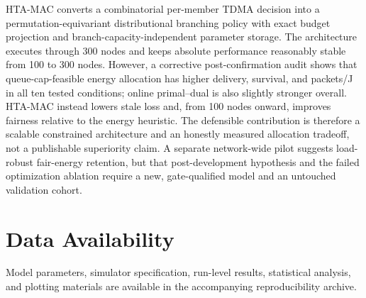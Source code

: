 \documentclass[journal]{IEEEtran}
\newcommand{\method}{HTA-MAC}
\begin{document}
\method{} converts a combinatorial per-member TDMA decision into a
permutation-equivariant distributional branching policy with exact budget
projection and branch-capacity-independent parameter storage. The architecture
executes through 300 nodes and keeps absolute performance
reasonably stable from 100 to 300 nodes. However, a corrective post-confirmation
audit shows that queue-cap-feasible energy allocation has higher delivery,
survival, and packets/J in all ten tested conditions; online primal--dual is
also slightly stronger overall. \method{} instead lowers stale loss and, from
100 nodes onward, improves fairness relative to the energy heuristic. The
defensible contribution is therefore a scalable constrained architecture and
an honestly measured allocation tradeoff, not a publishable superiority claim.
A separate network-wide pilot suggests load-robust fair-energy retention, but
that post-development hypothesis and the failed optimization ablation require a
new, gate-qualified model and an untouched validation cohort.

\section*{Data Availability}

Model parameters, simulator specification, run-level results, statistical
analysis, and plotting materials are available in the accompanying
reproducibility archive.
\end{document}
